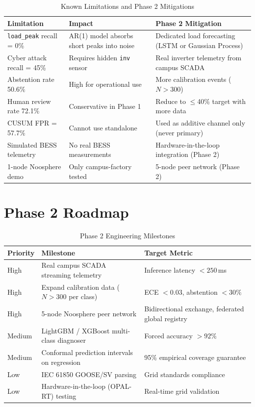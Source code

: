 \documentclass[12pt, a4paper]{article}
\begin{document}
\begin{table}[H]
\centering
\caption{Known Limitations and Phase 2 Mitigations}
\begin{tabularx}{\linewidth}{lXX}
\toprule
\textbf{Limitation} & \textbf{Impact} & \textbf{Phase 2 Mitigation}\\
\midrule
\texttt{load\_peak} recall = 0\% & AR(1) model absorbs short peaks into noise & Dedicated load forecasting (LSTM or Gaussian Process)\\
Cyber attack recall = 45\% & Requires hidden \texttt{inv} sensor & Real inverter telemetry from campus SCADA\\
Abstention rate 50.6\% & High for operational use & More calibration events ($N>300$)\\
Human review rate 72.1\% & Conservative in Phase 1 & Reduce to $\le$40\% target with more data\\
CUSUM FPR = 57.7\% & Cannot use standalone & Used as additive channel only (never primary)\\
Simulated BESS telemetry & No real BESS measurements & Hardware-in-the-loop integration (Phase 2)\\
1-node Noosphere demo & Only campus-factory tested & 5-node peer network (Phase 2)\\
\bottomrule
\end{tabularx}
\end{table}

\section{Phase 2 Roadmap}

\begin{table}[H]
\centering
\caption{Phase 2 Engineering Milestones}
\begin{tabularx}{\linewidth}{llX}
\toprule
\textbf{Priority} & \textbf{Milestone} & \textbf{Target Metric}\\
\midrule
High & Real campus SCADA streaming telemetry & Inference latency $< 250$\,ms\\
High & Expand calibration data ($N > 300$ per class) & ECE $< 0.03$, abstention $< 30\%$\\
High & 5-node Noosphere peer network & Bidirectional exchange, federated global registry\\
Medium & LightGBM / XGBoost multi-class diagnoser & Forced accuracy $> 92\%$\\
Medium & Conformal prediction intervals on regression & 95\% empirical coverage guarantee\\
Low & IEC 61850 GOOSE/SV parsing & Grid standards compliance\\
Low & Hardware-in-the-loop (OPAL-RT) testing & Real-time grid validation\\
\bottomrule
\end{tabularx}
\end{table}
\end{document}
